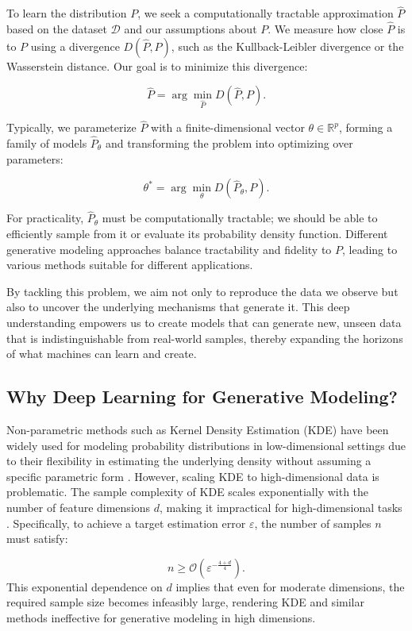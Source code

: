 To learn the distribution \( P \), we seek a computationally tractable approximation \( \hat{P} \) based on the dataset \( \mathcal{D} \) and our assumptions about \( P \). We measure how close \( \hat{P} \) is to \( P \) using a divergence \( D(\hat{P}, P) \), such as the Kullback-Leibler divergence or the Wasserstein distance. Our goal is to minimize this divergence:

\[
\hat{P} = \arg \min_{\hat{P}} D(\hat{P}, P).
\]

Typically, we parameterize \( \hat{P} \) with a finite-dimensional vector \( \theta \in \mathbb{R}^p \), forming a family of models \( \hat{P}_\theta \) and transforming the problem into optimizing over parameters:

\[
\theta^* = \arg \min_\theta D(\hat{P}_\theta, P).
\]

For practicality, \( \hat{P}_\theta \) must be computationally tractable; we should be able to efficiently sample from it or evaluate its probability density function. Different generative modeling approaches balance tractability and fidelity to \( P \), leading to various methods suitable for different applications.

By tackling this problem, we aim not only to reproduce the data we observe but also to uncover the underlying mechanisms that generate it. This deep understanding empowers us to create models that can generate new, unseen data that is indistinguishable from real-world samples, thereby expanding the horizons of what machines can learn and create.

\subsection{Why Deep Learning for Generative Modeling?}

Non-parametric methods such as Kernel Density Estimation (KDE) have been widely used for modeling probability distributions in low-dimensional settings due to their flexibility in estimating the underlying density without assuming a specific parametric form \cite{silverman1986density}. However, scaling KDE to high-dimensional data is problematic. The sample complexity of KDE scales exponentially with the number of feature dimensions \( d \), making it impractical for high-dimensional tasks \cite{wasserman2006all}. Specifically, to achieve a target estimation error \( \varepsilon \), the number of samples \( n \) must satisfy:

\[
n \geq \mathcal{O}\left(\varepsilon^{-\frac{4 + d}{4}}\right).
\]
\cite{scott2015multivariate}
This exponential dependence on \( d \) implies that even for moderate dimensions, the required sample size becomes infeasibly large, rendering KDE and similar methods ineffective for generative modeling in high dimensions.

